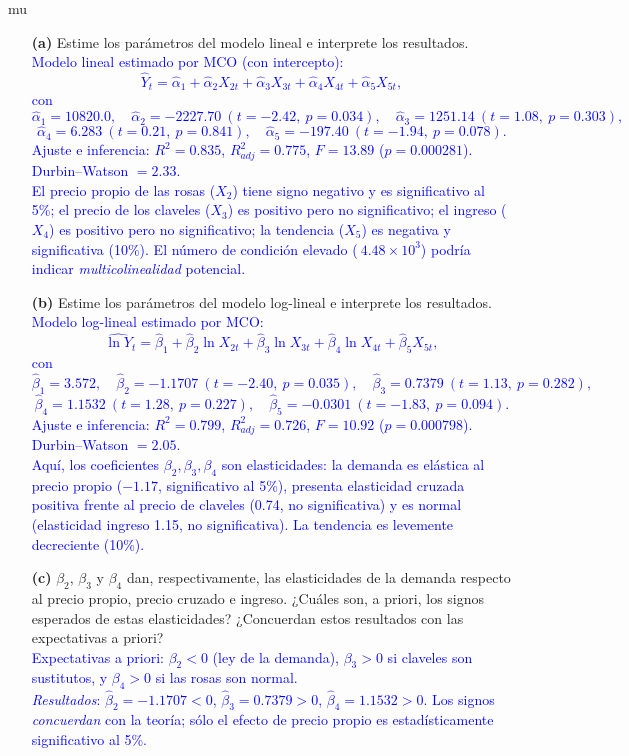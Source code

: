 mu\documentclass[10pt]{article}
\begin{document}
\begin{enumerate}
    \item[\textbf{(a)}] Estime los parámetros del modelo lineal e interprete los resultados.\\
    \textcolor{blue}{
        Modelo lineal estimado por MCO (con intercepto):
        \[
        \widehat{Y}_t= \hat{\alpha}_1 + \hat{\alpha}_2 X_{2t}+\hat{\alpha}_3 X_{3t}+\hat{\alpha}_4 X_{4t}+\hat{\alpha}_5 X_{5t},
        \]
        con $ \hat{\alpha}_1=10820.0,\quad \hat{\alpha}_2=-2227.70\ (t=-2.42,\ p=0.034),\quad \hat{\alpha}_3=1251.14\ (t=1.08,\ p=0.303),$
        \[
        \hat{\alpha}_4=6.283\ (t=0.21,\ p=0.841),\quad \hat{\alpha}_5=-197.40\ (t=-1.94,\ p=0.078).
        \]
        Ajuste e inferencia: \(R^2=0.835\), \(R^2_{adj}=0.775\), \(F=13.89\) (\(p=0.000281\)). Durbin–Watson \(=2.33\).\\
        El precio propio de las rosas (\(X_2\)) tiene signo negativo y es significativo al 5\%; el precio de los claveles (\(X_3\)) es positivo pero no significativo; el ingreso (\(X_4\)) es positivo pero no significativo; la tendencia (\(X_5\)) es negativa y significativa (10\%). El número de condición elevado (\(~4.48\times10^3\)) podría indicar \textit{multicolinealidad} potencial.
    }
    \item[\textbf{(b)}] Estime los parámetros del modelo log-lineal e interprete los resultados.\\
    \textcolor{blue}{
        Modelo log-lineal estimado por MCO:
        \[
        \widehat{\ln Y}_t= \hat{\beta}_1 + \hat{\beta}_2 \ln X_{2t}+\hat{\beta}_3 \ln X_{3t}+\hat{\beta}_4 \ln X_{4t}+\hat{\beta}_5 X_{5t},
        \]
        con $\hat{\beta}_1=3.572,\quad \hat{\beta}_2=-1.1707\ (t=-2.40,\ p=0.035),\quad \hat{\beta}_3=0.7379\ (t=1.13,\ p=0.282), $
        \[
        \hat{\beta}_4=1.1532\ (t=1.28,\ p=0.227),\quad \hat{\beta}_5=-0.0301\ (t=-1.83,\ p=0.094).
        \]
        Ajuste e inferencia: \(R^2=0.799\), \(R^2_{adj}=0.726\), \(F=10.92\) (\(p=0.000798\)). Durbin–Watson \(=2.05\).\\
        Aquí, los coeficientes \(\beta_2,\beta_3,\beta_4\) son elasticidades: la demanda es elástica al precio propio (\(-1.17\), significativo al 5\%), presenta elasticidad cruzada positiva frente al precio de claveles (0.74, no significativa) y es normal (elasticidad ingreso 1.15, no significativa). La tendencia es levemente decreciente (10\%).
        }

    \item[\textbf{(c)}] $\beta_2$, $\beta_3$ y $\beta_4$ dan, respectivamente, las elasticidades de la demanda respecto al precio propio, precio cruzado e ingreso. ¿Cuáles son, a priori, los signos esperados de estas elasticidades? ¿Concuerdan estos resultados con las expectativas a priori?\\
    \textcolor{blue}{
        Expectativas a priori: \(\beta_2<0\) (ley de la demanda), \(\beta_3>0\) si claveles son sustitutos, y \(\beta_4>0\) si las rosas son normal.\\
        \textit{Resultados}: \(\hat{\beta}_2=-1.1707<0\), \(\hat{\beta}_3=0.7379>0\), \(\hat{\beta}_4=1.1532>0\). Los signos \emph{concuerdan} con la teoría; sólo el efecto de precio propio es estadísticamente significativo al 5\%.
        }


\end{enumerate}
\end{document}
